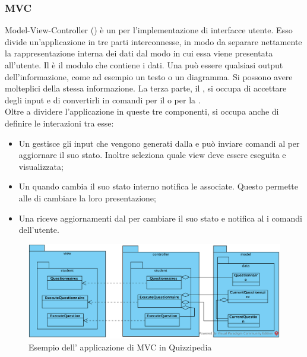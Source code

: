 \documentclass[12pt,a4paper]{article}
\begin{document}
\subsubsection{MVC}
Model-View-Controller () è un  per l’implementazione di interfacce utente. Esso divide un’applicazione  in tre parti interconnesse, in modo da separare nettamente la rappresentazione interna dei dati dal modo in cui essa viene presentata all’utente. Il  è il modulo che contiene i dati. Una  può essere qualsiasi output dell’informazione, come ad esempio un testo o un diagramma. Si possono avere molteplici  della stessa informazione. La terza parte, il , si occupa di accettare degli input e di convertirli in comandi per il  o per la .\\
Oltre a dividere l’applicazione in queste tre componenti,  si occupa anche di definire le interazioni tra esse:
\begin{itemize}
	\item Un  gestisce gli input che vengono generati dalla  e può inviare comandi al  per aggiornare il suo stato. Inoltre seleziona quale view deve essere eseguita e visualizzata;
	\item Un  quando cambia il suo stato interno notifica le  associate. Questo permette alle  di cambiare la loro presentazione;
	\item Una  riceve aggiornamenti dal  per cambiare il suo stato e notifica al  i comandi dell'utente.
\end{itemize}

\begin{center}
	\begin{figure}[H]
		\centering \includegraphics[max width=\textwidth]{../img/mvcStarware.png}
		\caption{Esempio dell' applicazione di MVC in Quizzipedia}
	\end{figure}
\end{center}
\end{document}
